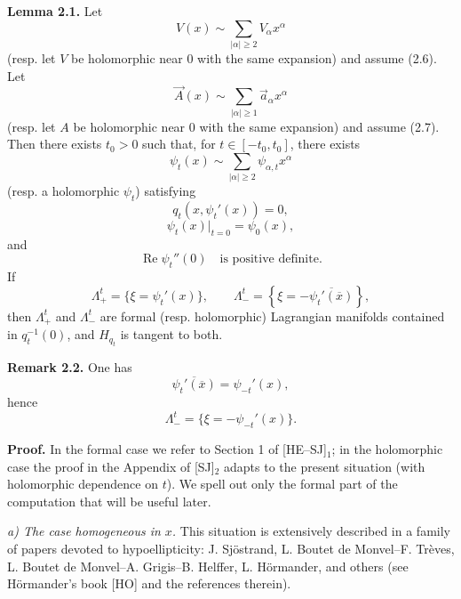 \documentclass[11pt]{article}
\newcommand{\Ree}{\operatorname{Re}}
\begin{document}
\medskip
\noindent\textbf{Lemma 2.1.}
Let
\[
V(x)\sim\sum_{|\alpha|\ge2}V_\alpha x^\alpha
\]
(resp. let $V$ be holomorphic near $0$ with the same expansion) and assume (2.6). Let
\[
\vec A(x)\sim\sum_{|\alpha|\ge1}\vec a_\alpha x^\alpha
\]
(resp. let $A$ be holomorphic near $0$ with the same expansion) and assume (2.7). Then there exists $t_0>0$ such that, for $t\in[-t_0,t_0]$, there exists
\[
\psi_t(x)\sim\sum_{|\alpha|\ge2}\psi_{\alpha,t}x^\alpha
\]
(resp. a holomorphic $\psi_t$) satisfying
\begin{equation}
q_t(x,\psi_t'(x))=0,
\tag{2.14}
\end{equation}
\begin{equation}
\psi_t(x)|_{t=0}=\psi_0(x),
\tag{2.15}
\end{equation}
and
\begin{equation}
\Ree\psi_t''(0)\quad\text{is positive definite}.
\tag{2.16}
\end{equation}
If
\begin{equation}
\Lambda_+^t=\{\xi=\psi_t'(x)\},
\qquad
\Lambda_-^t=\left\{\xi=-\overline{\psi_t'(\overline x)}\right\},
\tag{2.17}
\end{equation}
then $\Lambda_+^t$ and $\Lambda_-^t$ are formal (resp. holomorphic) Lagrangian manifolds contained in $q_t^{-1}(0)$, and $H_{q_t}$ is tangent to both.

\medskip
\noindent\textbf{Remark 2.2.}
One has
\[
\overline{\psi_t'(\overline x)}=\psi_{-t}'(x),
\]
hence
\[
\Lambda_-^t=\{\xi=-\psi_{-t}'(x)\}.
\]

\noindent\textbf{Proof.}
In the formal case we refer to Section 1 of [HE--SJ]$_1$; in the holomorphic case the proof in the Appendix of [SJ]$_2$ adapts to the present situation (with holomorphic dependence on $t$). We spell out only the formal part of the computation that will be useful later.

\smallskip
\noindent\emph{a) The case homogeneous in $x$.}
This situation is extensively described in a family of papers devoted to hypoellipticity: J. Sjöstrand, L. Boutet de Monvel--F. Trèves, L. Boutet de Monvel--A. Grigis--B. Helffer, L. Hörmander, and others (see Hörmander's book [HO] and the references therein).
\end{document}
